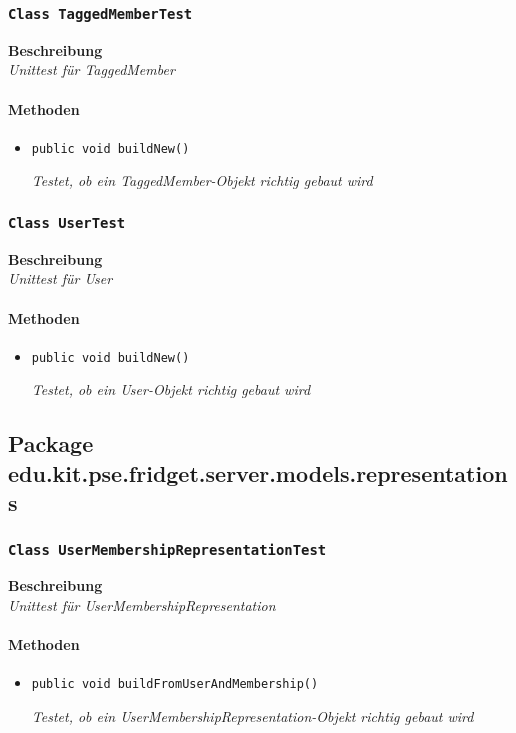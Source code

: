  \subsubsection{\texttt{Class TaggedMemberTest}}
 \textbf{Beschreibung} \\
 \textit{Unittest für TaggedMember}
 \paragraph*{Methoden}
 \begin{itemize}
    	\item{\texttt{public void buildNew()}}
    	
    	\textit{Testet, ob ein TaggedMember-Objekt richtig gebaut wird}
 \end{itemize}
 
 \subsubsection{\texttt{Class UserTest}}
 \textbf{Beschreibung} \\
 \textit{Unittest für User}
 \paragraph*{Methoden}
 \begin{itemize}
    	\item{\texttt{public void buildNew()}}
    	
    	\textit{Testet, ob ein User-Objekt richtig gebaut wird}
 \end{itemize}

 \subsection{Package edu.kit.pse.fridget.server.models.representations}
 \subsubsection{\texttt{Class UserMembershipRepresentationTest}}
 \textbf{Beschreibung} \\
 \textit{Unittest für UserMembershipRepresentation}
 \paragraph*{Methoden}
 \begin{itemize}
    	\item{\texttt{public void buildFromUserAndMembership()}}
    	
    	\textit{Testet, ob ein UserMembershipRepresentation-Objekt richtig gebaut wird}
 \end{itemize}
 
